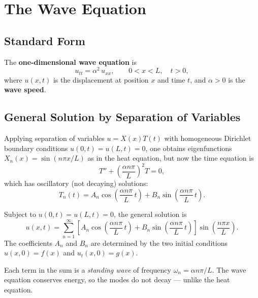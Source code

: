\chapter{The Wave Equation}

\section{Standard Form}

\begin{definition}
The \textbf{one-dimensional wave equation} is
\[
  u_{tt} = \alpha^2\, u_{xx}, \qquad 0 < x < L,\quad t > 0,
\]
where $u(x,t)$ is the displacement at position $x$ and time $t$, and $\alpha > 0$ is the \textbf{wave speed}.
\end{definition}

\section{General Solution by Separation of Variables}

Applying separation of variables $u = X(x)T(t)$ with homogeneous Dirichlet boundary conditions $u(0,t) = u(L,t) = 0$, one obtains eigenfunctions $X_n(x) = \sin(n\pi x/L)$ as in the heat equation, but now the time equation is
\[
  T'' + \left(\frac{\alpha n\pi}{L}\right)^2 T = 0,
\]
which has oscillatory (not decaying) solutions:
\[
  T_n(t) = A_n\cos\!\left(\frac{\alpha n\pi}{L}\,t\right) + B_n\sin\!\left(\frac{\alpha n\pi}{L}\,t\right).
\]

\begin{theorem}
Subject to $u(0,t)=u(L,t)=0$, the general solution is
\[
  \boxed{u(x,t) = \sum_{n=1}^{\infty}
    \left[A_n\cos\!\left(\frac{\alpha n\pi}{L}\,t\right)
         + B_n\sin\!\left(\frac{\alpha n\pi}{L}\,t\right)\right]
    \sin\!\left(\frac{n\pi x}{L}\right).}
\]
The coefficients $A_n$ and $B_n$ are determined by the two initial conditions $u(x,0)=f(x)$ and $u_t(x,0)=g(x)$.
\end{theorem}

\begin{remark}
Each term in the sum is a \emph{standing wave} of frequency $\omega_n = \alpha n\pi / L$. The wave equation conserves energy, so the modes do not decay — unlike the heat equation.
\end{remark}

